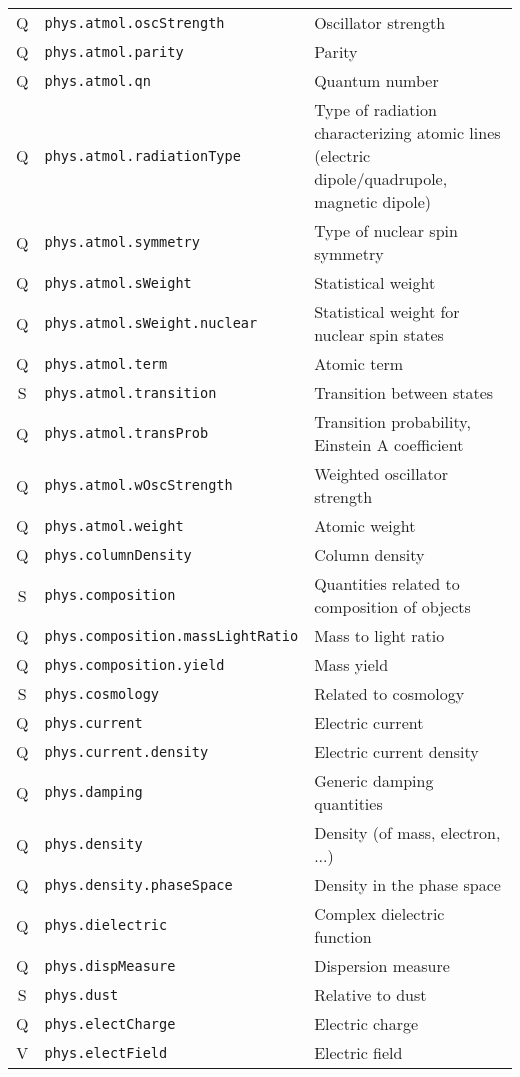\documentclass[11pt,a4paper]{ivoa}
\begin{document}
\begin{longtable}[h!]{c|p{40ex}|p{}}
Q & {\tt phys.atmol.oscStrength} & Oscillator strength\\
Q & {\tt phys.atmol.parity} & Parity\\
Q & {\tt phys.atmol.qn} & Quantum number\\
Q & {\tt phys.atmol.radiationType} & Type of radiation characterizing atomic lines (electric dipole/quadrupole, magnetic dipole)\\
Q & {\tt phys.atmol.symmetry} & Type of nuclear spin symmetry\\
Q & {\tt phys.atmol.sWeight} & Statistical weight\\
Q & {\tt phys.atmol.sWeight.nuclear} & Statistical weight for nuclear spin states\\
Q & {\tt phys.atmol.term} & Atomic term\\
S & {\tt phys.atmol.transition} & Transition between states\\
Q & {\tt phys.atmol.transProb} & Transition probability, Einstein A coefficient\\
Q & {\tt phys.atmol.wOscStrength} & Weighted oscillator strength\\
Q & {\tt phys.atmol.weight} & Atomic weight\\
Q & {\tt phys.columnDensity} & Column density\\
S & {\tt phys.composition} & Quantities related to composition of objects\\
Q & {\tt phys.composition.massLightRatio} & Mass to light ratio\\
Q & {\tt phys.composition.yield} & Mass yield\\
S & {\tt phys.cosmology} & Related to cosmology\\
Q & {\tt phys.current} & Electric current\\
Q & {\tt phys.current.density} & Electric current density\\
Q & {\tt phys.damping} & Generic damping quantities\\
Q & {\tt phys.density} & Density (of mass, electron, ...)\\
Q & {\tt phys.density.phaseSpace} & Density in the phase space\\
Q & {\tt phys.dielectric} & Complex dielectric function\\
Q & {\tt phys.dispMeasure} & Dispersion measure\\
S & {\tt phys.dust} & Relative to dust\\
Q & {\tt phys.electCharge} & Electric charge\\
V & {\tt phys.electField} & Electric field\\

\end{longtable}
\end{document}

